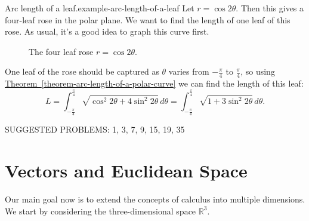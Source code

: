 \documentclass[10pt,]{book}
\numberwithin{equation}{section}
\newcommand{\RR}{\mathbb{R}}
\begin{document}
\begin{example}{Arc length of a leaf.}{example-arc-length-of-a-leaf}%
\hypertarget{p-1058}{}%
Let \(r = \cos2\theta\). Then this gives a four-leaf rose in the polar plane. We want to find the length of one leaf of this rose. As usual, it's a good idea to graph this curve first.%
\begin{figure}
\centering
{
}
\caption{The four leaf rose \(r=\cos2\theta\).\label{figure-rose}}
\end{figure}
\hypertarget{p-1059}{}%
One leaf of the rose should be captured as \(\theta\) varies from \(-\frac{\pi}{4}\) to \(\frac{\pi}{4}\), so using \hyperref[theorem-arc-length-of-a-polar-curve]{Theorem~\ref{theorem-arc-length-of-a-polar-curve}} we can find the length of this leaf:%
%
\begin{equation*}
L = \int_{-\frac{\pi}{4}}^{\frac{\pi}{4}}\sqrt{\cos^{2}2\theta + 4\sin^{2}2\theta}\,d\theta = \int_{-\frac{\pi}{4}}^{\frac{\pi}{4}}\sqrt{1 + 3\sin^{2}2\theta}\,d\theta.
\end{equation*}
\end{example}
\hypertarget{p-1060}{}%
SUGGESTED PROBLEMS: 1, 3, 7, 9, 15, 19, 35%
%
%
\typeout{************************************************}
\typeout{************************************************}
%
\chapter[{Vectors and Euclidean Space}]{Vectors and Euclidean Space}\label{vectors-space-geometry}
\begin{introduction}{}%
\hypertarget{p-1061}{}%
Our main goal now is to extend the concepts of calculus into multiple dimensions. We start by considering the three-dimensional space \(\RR^{3}\).%
\end{introduction}%
%
%
\typeout{************************************************}
\typeout{************************************************}
%
\end{document}
